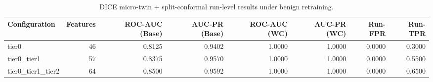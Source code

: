 \begin{table}[t]
\centering
\caption{DICE micro-twin + split-conformal run-level results under benign retraining.}
\label{tab:dice_full_overall}
\footnotesize
\begin{tabular}{lrrrrrrr}
\toprule
Configuration & Features & ROC-AUC (Base) & AUC-PR (Base) & ROC-AUC (WC) & AUC-PR (WC) & Run-FPR & Run-TPR \\
\midrule
tier0 & 46 & 0.8125 & 0.9402 & 1.0000 & 1.0000 & 0.0000 & 0.3000 \\
tier0_tier1 & 57 & 0.8375 & 0.9570 & 1.0000 & 1.0000 & 0.0000 & 0.5500 \\
tier0_tier1_tier2 & 64 & 0.8500 & 0.9592 & 1.0000 & 1.0000 & 0.0000 & 0.6500 \\
\bottomrule
\end{tabular}

\end{table}
